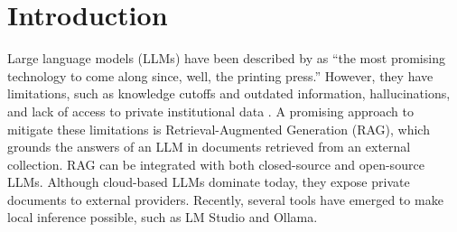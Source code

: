\documentclass[bdcc,article,submit,pdftex,moreauthors]{Definitions/mdpi}
\newcommand{\commentRed}[1]{\textcolor{red}{#1}}
\begin{document}


\section{Introduction}


Large language models (LLMs) have been described by \citet{brousseau2025llms} as ``the most promising technology to come along since, well, the printing press.'' However, they have limitations, such as knowledge cutoffs and outdated information, hallucinations, and lack of access to private institutional data \cite{bratanic2025essential}.
A promising approach to mitigate these limitations is Retrieval-Augmented Generation (RAG), which grounds the answers of an LLM in documents retrieved from an external collection.
RAG can be integrated with both closed-source and open-source LLMs.
Although cloud-based LLMs dominate today, they expose private documents to external providers. Recently, several tools have emerged to make local inference possible, such as LM Studio and Ollama.
\end{document}

